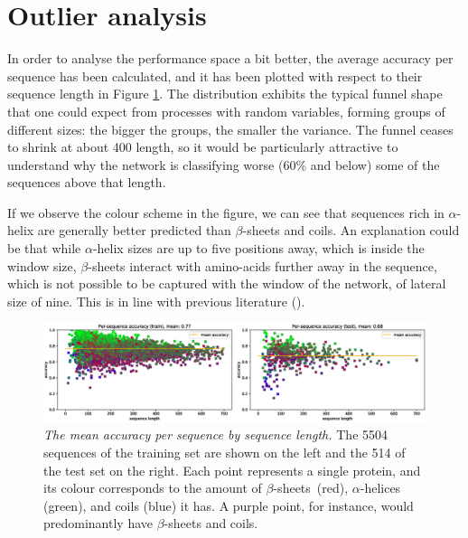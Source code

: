 \section{Outlier analysis} \label{sect:outliers}

In order to analyse the performance space a bit better, the average accuracy per sequence has been calculated, and it has been plotted with respect to their sequence length in Figure \ref{fig:per_seq_acc}. The distribution exhibits the typical funnel shape that one could expect from processes with random variables, forming groups of different sizes: the bigger the groups, the smaller the variance. The funnel ceases to shrink at about 400 length, so it would be particularly attractive to understand why the network is classifying worse (60\% and below) some of the sequences above that length.

If we observe the colour scheme in the figure, we can see that sequences rich in $\alpha$-helix are generally better predicted than $\beta$-sheets and coils. An explanation could be that while $\alpha$-helix sizes are up to five positions away, which is inside the window size, $\beta$-sheets interact with amino-acids further away in the sequence, which is not possible to be captured with the window of the network, of lateral size of nine. This is in line with previous literature (\cite{Rost2001}).

\begin{figure}
	\centering
	\includegraphics[width=1\linewidth]{Figures/per_seq_acc}
	\caption{\textit{The mean accuracy per sequence by sequence length.} The 5504 sequences of the training set are shown on the left and the 514 of the test set on the right. Each point represents a single protein, and its colour corresponds to the amount of $\beta$-sheets~(red), $\alpha$-helices (green), and coils (blue) it has. A purple point, for instance, would predominantly have $\beta$-sheets and coils.}
	\label{fig:per_seq_acc}
\end{figure}

